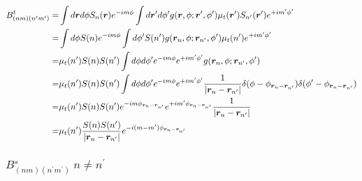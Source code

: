 \documentclass [10pt,letterpaper]{article}
\begin{document}
\begin{equation} \label{eq:result-Btnmnpmp-off-diagonal-1pt}
	\begin{split}
		B^t_{(n m)(n^\prime m^\prime)}
		=&
		\int d\vectorsym{r} d\phi
		S_n(\vectorsym{r})
		e^{-i m \phi}
		\int d\vectorsym{r}^\prime d\phi^\prime
		g(\vectorsym{r},\phi;\vectorsym{r}^\prime,\phi^\prime)
		\mu_t(\vectorsym{r}^\prime)
		S_{n^\prime}(\vectorsym{r}^\prime)
		e^{+i m^\prime \phi^\prime}
		\\
		=&
		\int d\phi
		S(n)
		e^{-i m \phi}
		\int d\phi^\prime
		S(n^\prime)
		g(\vectorsym{r}_n,\phi;\vectorsym{r}_{n^\prime},\phi^\prime)
		\mu_t(n^\prime)
		e^{+i m^\prime \phi^\prime} 
		\\
		=& 
		\mu_t(n^\prime) S(n) S(n^\prime)
		\int d\phi d\phi^\prime
		e^{-i m \phi}
		e^{+i m^\prime \phi^\prime} 
		g(\vectorsym{r}_n,\phi;\vectorsym{r}_{n^\prime},\phi^\prime)
		\\
		=& 
		\mu_t(n^\prime) S(n) S(n^\prime)
		\int d\phi d\phi^\prime
		e^{-i m \phi}
		e^{+i m^\prime \phi^\prime} 
		\frac{1}{\lvert\vectorsym{r}_n-\vectorsym{r}_{n^\prime}\rvert}
		\delta(\phi-\phi_{\vectorsym{r}_n-\vectorsym{r}_{n^\prime}})
		\delta(\phi^\prime-\phi_{\vectorsym{r}_n-\vectorsym{r}_{n^\prime}})
		\\
		=& 
		\mu_t(n^\prime) S(n) S(n^\prime)
		e^{-i m \phi_{\vectorsym{r}_n-\vectorsym{r}_{n^\prime}}}
		e^{+i m^\prime \phi_{\vectorsym{r}_n-\vectorsym{r}_{n^\prime}}} 
		\frac{1}{\lvert\vectorsym{r}_n-\vectorsym{r}_{n^\prime}\rvert}
		\\
		=& 
		\mu_t(n^\prime) 
		\frac{S(n) S(n^\prime)}{\lvert\vectorsym{r}_n-\vectorsym{r}_{n^\prime}\rvert}
		e^{-i (m-m^\prime) \phi_{\vectorsym{r}_n-\vectorsym{r}_{n^\prime}}}
	\end{split}
\end{equation}

\subsubsection{$B^s_{(n m)(n^\prime m^\prime)} \ n\neq n^\prime$}
\label{subsub:Bsnmnpmp-off-diagonal}
\end{document}
